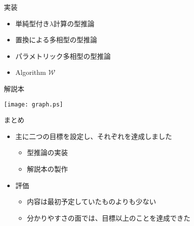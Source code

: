 \documentclass[cjk, 17pt]{beamer}
\begin{document}
\begin{frame}{実装}

 \begin{itemize}
  \item 単純型付き$\lambda$計算の型推論
  \item 置換による多相型の型推論
  \item パラメトリック多相型の型推論
  \item Algorithm $\mathcal W$
 \end{itemize}

\end{frame}

\begin{frame}{解説本}

\texttt{[image: graph.ps]}

\end{frame}

\begin{frame}{まとめ}

  \begin{itemize}
    \item 主に二つの目標を設定し、それぞれを達成しました
    \begin{itemize}
      \item 型推論の実装
      \item 解説本の製作
    \end{itemize}
    \item 評価
    \begin{itemize}
      \item 内容は最初予定していたものよりも少ない
      \item 分かりやすさの面では、目標以上のことを達成できた
    \end{itemize}
  \end{itemize}

\end{frame}
\end{document}
